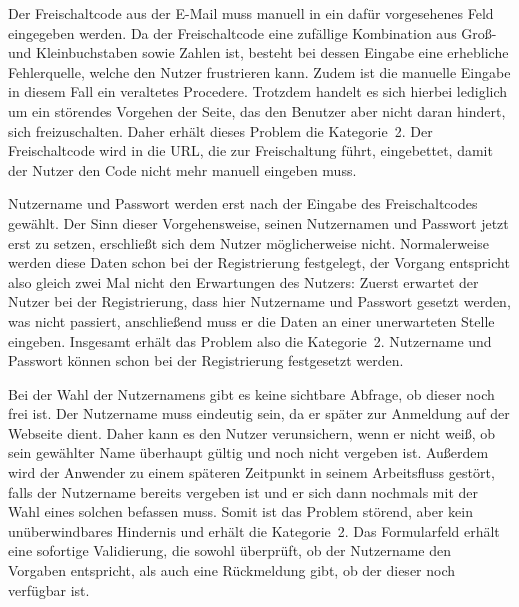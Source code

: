 {
Der Freischaltcode aus der E\hbox{-}Mail muss manuell in ein dafür vorgesehenes Feld eingegeben werden.
}
{
Da der Freischaltcode eine zufällige Kombination aus Groß- und Kleinbuchstaben sowie Zahlen ist, besteht bei dessen Eingabe eine erhebliche Fehlerquelle, welche den Nutzer frustrieren kann. Zudem ist die manuelle Eingabe in diesem Fall ein veraltetes Procedere. Trotzdem handelt es sich hierbei lediglich um ein störendes Vorgehen der Seite, das den Benutzer aber nicht daran hindert, sich freizuschalten. Daher erhält dieses Problem die Kategorie~2.
}
{
Der Freischaltcode wird in die URL, die zur Freischaltung führt, eingebettet, damit der Nutzer den Code nicht mehr manuell eingeben muss.
}
\label{prob:frei:codeeingabe}

{
Nutzername und Passwort werden erst nach der Eingabe des Freischaltcodes gewählt. 
}
{
Der Sinn dieser Vorgehensweise, seinen Nutzernamen und Passwort jetzt erst zu setzen, erschließt sich dem Nutzer möglicherweise nicht. Normalerweise werden diese Daten schon bei der Registrierung festgelegt, der Vorgang entspricht also gleich zwei Mal nicht den Erwartungen des Nutzers: Zuerst erwartet der Nutzer bei der Registrierung, dass hier Nutzername und Passwort gesetzt werden, was nicht passiert, anschließend muss er die Daten an einer unerwarteten Stelle eingeben. Insgesamt erhält das Problem also die Kategorie~2.
}
{
Nutzername und Passwort können schon bei der Registrierung festgesetzt werden.
}
\label{prob:frei:nutzerundpw}

{
Bei der Wahl der Nutzernamens gibt es keine sichtbare Abfrage, ob dieser noch frei ist.
}
{
Der Nutzername muss eindeutig sein, da er später zur Anmeldung auf der Webseite dient. Daher kann es den Nutzer verunsichern, wenn er nicht weiß, ob sein gewählter Name überhaupt gültig und noch nicht vergeben ist. Außerdem wird der Anwender zu einem späteren Zeitpunkt in seinem Arbeitsfluss gestört, falls der Nutzername bereits vergeben ist und er sich dann nochmals mit der Wahl eines solchen befassen muss. Somit ist das Problem störend, aber kein unüberwindbares Hindernis und erhält die Kategorie~2.
}
{
Das Formularfeld erhält eine sofortige Validierung, die sowohl überprüft, ob der Nutzername den Vorgaben entspricht, als auch eine Rückmeldung gibt, ob der dieser noch verfügbar ist.
}
\label{prob:frei:nutzerverfuegbar}

